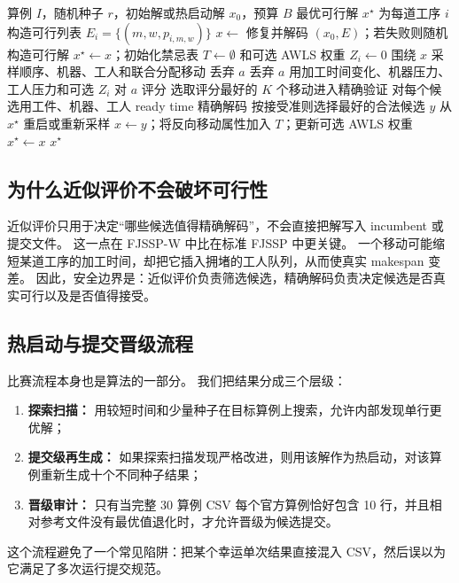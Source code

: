 \documentclass[UTF8,a4paper,zihao=-4]{ctexart}
\begin{document}
\begin{algorithm}[t]
  \caption{工人感知热启动禁忌搜索}
  \label{alg:search-zh}
  \begin{algorithmic}[1]
    \Require 算例 $I$，随机种子 $r$，初始解或热启动解 $x_0$，预算 $B$
    \Ensure 最优可行解 $x^\star$
    \State 为每道工序 $i$ 构造可行列表 $E_i=\{(m,w,p_{i,m,w})\}$
    \State $x\gets$ 修复并解码 $(x_0,E)$；若失败则随机构造可行解
    \State $x^\star\gets x$；初始化禁忌表 $T\gets\emptyset$ 和可选 AWLS 权重 $Z_i\gets0$
      \State 围绕 $x$ 采样顺序、机器、工人和联合分配移动
          \State 丢弃 $a$
          \State 丢弃 $a$
        \Else
          \State 用加工时间变化、机器压力、工人压力和可选 $Z_i$ 对 $a$ 评分
        \EndIf
      \EndFor
      \State 选取评分最好的 $K$ 个移动进入精确验证
      \State 对每个候选用工件、机器、工人 ready time 精确解码
      \State 按接受准则选择最好的合法候选 $y$
        \State 从 $x^\star$ 重启或重新采样
      \Else
        \State $x\gets y$；将反向移动属性加入 $T$；更新可选 AWLS 权重
          \State $x^\star\gets x$
        \EndIf
      \EndIf
    \EndWhile
    \State \Return $x^\star$
  \end{algorithmic}
\end{algorithm}

\subsection{为什么近似评价不会破坏可行性}
近似评价只用于决定“哪些候选值得精确解码”，不会直接把解写入 incumbent 或提交文件。
这一点在 FJSSP-W 中比在标准 FJSSP 中更关键。
一个移动可能缩短某道工序的加工时间，却把它插入拥堵的工人队列，从而使真实 makespan 变差。
因此，安全边界是：近似评价负责筛选候选，精确解码负责决定候选是否真实可行以及是否值得接受。

\subsection{热启动与提交晋级流程}
比赛流程本身也是算法的一部分。
我们把结果分成三个层级：
\begin{enumerate}
  \item \textbf{探索扫描：} 用较短时间和少量种子在目标算例上搜索，允许内部发现单行更优解；
  \item \textbf{提交级再生成：} 如果探索扫描发现严格改进，则用该解作为热启动，对该算例重新生成十个不同种子结果；
  \item \textbf{晋级审计：} 只有当完整 30 算例 CSV 每个官方算例恰好包含 10 行，并且相对参考文件没有最优值退化时，才允许晋级为候选提交。
\end{enumerate}
这个流程避免了一个常见陷阱：把某个幸运单次结果直接混入 CSV，然后误以为它满足了多次运行提交规范。
\end{document}

